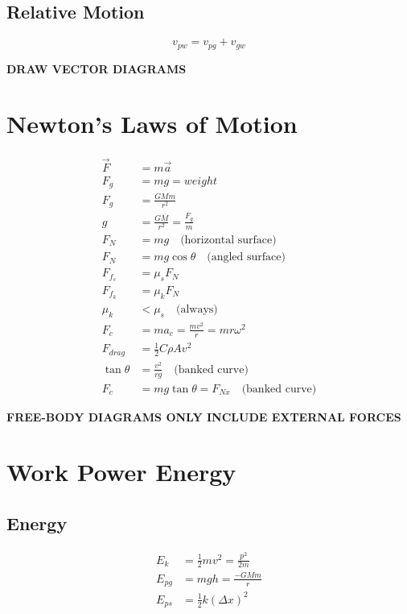 \documentclass[letterpaper,10pt]{article}
\begin{document}
\begin{multicols}{2}
\subsection{Relative Motion}
\begin{equation*}
    v_{pw} = v_{pg} + v_{gw}
\end{equation*}

\bigskip
\begin{center}
    \textbf{DRAW VECTOR DIAGRAMS}
\end{center}

\section{Newton's Laws of Motion}
\begin{align*}
    \vec{F} &= m \vec{a} \\
    F_g &= mg = weight \\
    F_g &= \frac{GMm}{r^2} \\
    g &= \frac{GM}{r^2} = \frac{F_g}{m} \\
    F_N &= mg \quad \textrm{(horizontal surface)} \\
    F_N &= mg \cos \theta \quad \textrm{(angled surface)} \\
    F_{f_s} &= \mu_s F_N \\
    F_{f_k} &= \mu_k F_N \\
    \mu_k &< \mu_s \quad \textrm{(always)} \\
    F_c &= m a_c = \frac{m v^2}{r} = m r \omega^2 \\
    F_{drag} &= \tfrac{1}{2} C \rho A v^2 \\
    \tan \theta &= \frac{v^2}{rg} \quad \textrm{(banked curve)} \\
    F_c &= mg \tan \theta = F_{Nx} \quad \textrm{(banked curve)}
\end{align*}

\bigskip
\begin{center}
    \textbf{FREE-BODY DIAGRAMS ONLY INCLUDE EXTERNAL FORCES}
\end{center}

\section{Work Power Energy}
\subsection{Energy}
\begin{align*}
    E_k &= \tfrac{1}{2} m v^2 = \frac{p^2}{2m} \\
    E_{pg} &= mgh = \frac{-GMm}{r} \\
    E_{ps} &= \tfrac{1}{2} k \left( \Delta x \right)^2
\end{align*}


\end{multicols}
\end{document}
